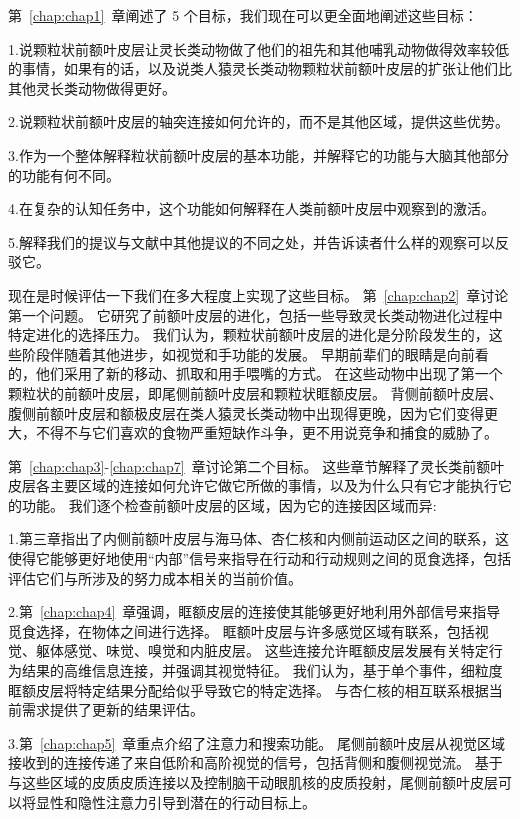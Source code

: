 第~\ref{chap:chap1}~章阐述了 5 个目标，我们现在可以更全面地阐述这些目标：
\par
1.说颗粒状前额叶皮层让灵长类动物做了他们的祖先和其他哺乳动物做得效率较低的事情，如果有的话，以及说类人猿灵长类动物颗粒状前额叶皮层的扩张让他们比其他灵长类动物做得更好。
\par
2.说颗粒状前额叶皮层的轴突连接如何允许的，而不是其他区域，提供这些优势。
\par
3.作为一个整体解释粒状前额叶皮层的基本功能，并解释它的功能与大脑其他部分的功能有何不同。
\par 
4.在复杂的认知任务中，这个功能如何解释在人类前额叶皮层中观察到的激活。
\par 
5.解释我们的提议与文献中其他提议的不同之处，并告诉读者什么样的观察可以反驳它。
\par 
现在是时候评估一下我们在多大程度上实现了这些目标。
第~\ref{chap:chap2}~章讨论第一个问题。
它研究了前额叶皮层的进化，包括一些导致灵长类动物进化过程中特定进化的选择压力。
我们认为，颗粒状前额叶皮层的进化是分阶段发生的，这些阶段伴随着其他进步，如视觉和手功能的发展。
早期前辈们的眼睛是向前看的，他们采用了新的移动、抓取和用手喂嘴的方式。
在这些动物中出现了第一个颗粒状的前额叶皮层，即尾侧前额叶皮层和颗粒状眶额皮层。
背侧前额叶皮层、腹侧前额叶皮层和额极皮层在类人猿灵长类动物中出现得更晚，因为它们变得更大，不得不与它们喜欢的食物严重短缺作斗争，更不用说竞争和捕食的威胁了。
\par 
第~\ref{chap:chap3}-\ref{chap:chap7}~章讨论第二个目标。
这些章节解释了灵长类前额叶皮层各主要区域的连接如何允许它做它所做的事情，以及为什么只有它才能执行它的功能。
我们逐个检查前额叶皮层的区域，因为它的连接因区域而异:
\par 
1.第三章指出了内侧前额叶皮层与海马体、杏仁核和内侧前运动区之间的联系，这使得它能够更好地使用“内部”信号来指导在行动和行动规则之间的觅食选择，包括评估它们与所涉及的努力成本相关的当前价值。
\par 
2.第~\ref{chap:chap4}~章强调，眶额皮层的连接使其能够更好地利用外部信号来指导觅食选择，在物体之间进行选择。
眶额叶皮层与许多感觉区域有联系，包括视觉、躯体感觉、味觉、嗅觉和内脏皮层。
这些连接允许眶额皮层发展有关特定行为结果的高维信息连接，并强调其视觉特征。
我们认为，基于单个事件，细粒度眶额皮层将特定结果分配给似乎导致它的特定选择。
与杏仁核的相互联系根据当前需求提供了更新的结果评估。
\par 
3.第~\ref{chap:chap5}~章重点介绍了注意力和搜索功能。
尾侧前额叶皮层从视觉区域接收到的连接传递了来自低阶和高阶视觉的信号，包括背侧和腹侧视觉流。
基于与这些区域的皮质皮质连接以及控制脑干动眼肌核的皮质投射，尾侧前额叶皮层可以将显性和隐性注意力引导到潜在的行动目标上。
